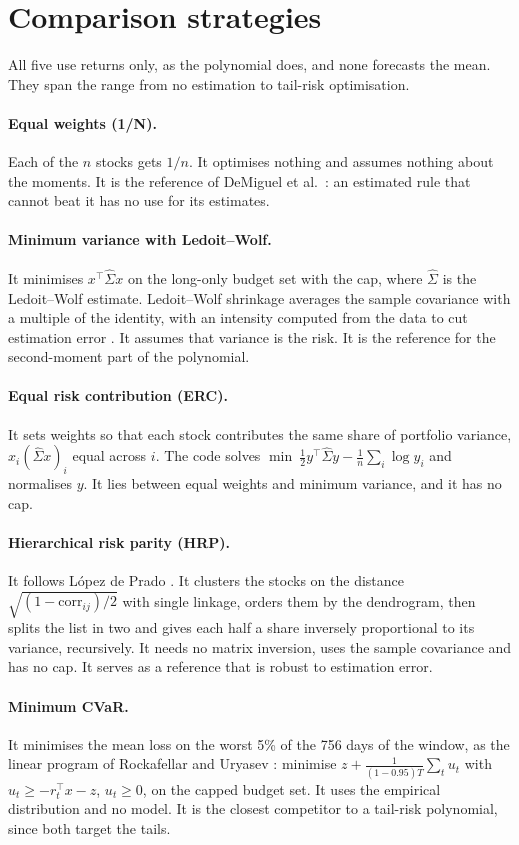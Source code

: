 \documentclass[11pt,a4paper]{article}
\begin{document}
\section{Comparison strategies}\label{app:ref}
All five use returns only, as the polynomial does, and none forecasts the mean.
They span the range from no estimation to tail-risk optimisation.
\paragraph{Equal weights (1/N).}
Each of the $n$ stocks gets $1/n$.
It optimises nothing and assumes nothing about the moments.
It is the reference of DeMiguel et al.\ \cite{demiguel2009}: an estimated rule that cannot beat it has no use for its estimates.
\paragraph{Minimum variance with Ledoit--Wolf.}
It minimises $x^\top\hat\Sigma x$ on the long-only budget set with the cap, where $\hat\Sigma$ is the Ledoit--Wolf estimate.
Ledoit--Wolf shrinkage averages the sample covariance with a multiple of the identity, with an intensity computed from the data to cut estimation error \cite{ledoit2004}.
It assumes that variance is the risk.
It is the reference for the second-moment part of the polynomial.
\paragraph{Equal risk contribution (ERC).}
It sets weights so that each stock contributes the same share of portfolio variance, $x_i(\hat\Sigma x)_i$ equal across $i$.
The code solves $\min\ \tfrac12y^\top\hat\Sigma y-\tfrac1n\sum_i\log y_i$ and normalises $y$.
It lies between equal weights and minimum variance, and it has no cap.
\paragraph{Hierarchical risk parity (HRP).}
It follows L\'opez de Prado \cite{lopezdeprado2016}.
It clusters the stocks on the distance $\sqrt{(1-\mathrm{corr}_{ij})/2}$ with single linkage, orders them by the dendrogram, then splits the list in two and gives each half a share inversely proportional to its variance, recursively.
It needs no matrix inversion, uses the sample covariance and has no cap.
It serves as a reference that is robust to estimation error.
\paragraph{Minimum CVaR.}
It minimises the mean loss on the worst 5\% of the 756 days of the window, as the linear program of Rockafellar and Uryasev \cite{rockafellar2000}: minimise $z+\frac1{(1-0.95)T}\sum_tu_t$ with $u_t\ge-r_t^\top x-z$, $u_t\ge0$, on the capped budget set.
It uses the empirical distribution and no model.
It is the closest competitor to a tail-risk polynomial, since both target the tails.
\end{document}
